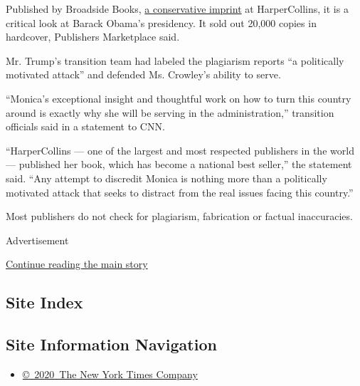 Published by Broadside Books,
\href{https://mediadecoder.blogs.nytimes.com/2010/09/27/harpercollins-to-start-conservative-imprint-broadside-books/}{a
conservative imprint} at HarperCollins, it is a critical look at Barack
Obama's presidency. It sold out 20,000 copies in hardcover, Publishers
Marketplace said.

Mr. Trump's transition team had labeled the plagiarism reports ``a
politically motivated attack'' and defended Ms. Crowley's ability to
serve.

``Monica's exceptional insight and thoughtful work on how to turn this
country around is exactly why she will be serving in the
administration,'' transition officials said in a statement to CNN.

``HarperCollins --- one of the largest and most respected publishers in
the world --- published her book, which has become a national best
seller,'' the statement said. ``Any attempt to discredit Monica is
nothing more than a politically motivated attack that seeks to distract
from the real issues facing this country.''

Most publishers do not check for plagiarism, fabrication or factual
inaccuracies.

Advertisement

\protect\hyperlink{after-bottom}{Continue reading the main story}

\hypertarget{site-index}{%
\subsection{Site Index}\label{site-index}}

\hypertarget{site-information-navigation}{%
\subsection{Site Information
Navigation}\label{site-information-navigation}}

\begin{itemize}
\tightlist
\item
  \href{https://help.nytimes.com/hc/en-us/articles/115014792127-Copyright-notice}{©~2020~The
  New York Times Company}
\end{itemize}


